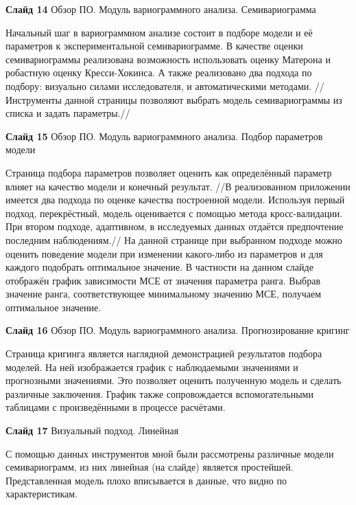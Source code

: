 \documentclass[a4paper,10pt]{report}
\begin{document}
\textbf{Слайд 14} Обзор ПО. Модуль вариограммного анализа. Семивариограмма

Начальный шаг в вариограммном анализе состоит в подборе модели и её параметров к экспериментальной семивариограмме. В качестве оценки семивариограммы реализована возможность использовать оценку Матерона и робастную оценку Кресси-Хокинса. А также реализовано два подхода по подбору: визуально силами исследователя, и автоматическими методами. //Инструменты данной страницы позволяют выбрать модель семивариограммы из списка и задать параметры.//

\textbf{Слайд 15} Обзор ПО. Модуль вариограммного анализа. Подбор параметров модели

Страница подбора параметров позволяет оценить как определённый параметр влияет на качество модели и конечный результат. //В реализованном приложении имеется два подхода по оценке качества построенной модели. Используя первый подход, перекрёстный, модель оценивается с помощью метода кросс-валидации. При втором подходе, адаптивном, в исследуемых данных отдаётся предпочтение последним наблюдениям.// На данной странице при выбранном подходе можно оценить поведение модели при изменении какого-либо из параметров и для каждого подобрать оптимальное значение. В частности на данном слайде отображён график зависимости МСЕ от значения параметра ранга. Выбрав значение ранга, соответствующее минимальному значению МСЕ, получаем оптимальное значение.

\textbf{Слайд 16} Обзор ПО. Модуль вариограммного анализа. Прогнозирование кригинг

Страница кригинга является наглядной демонстрацией результатов подбора моделей. На ней изображается график с наблюдаемыми значениями и прогнозными значениями. Это позволяет оценить полученную модель и сделать различные заключения. График также сопровождается вспомогательными таблицами с произведёнными в процессе расчётами.

\textbf{Слайд 17} Визуальный подход. Линейная

С помощью данных инструментов мной были рассмотрены различные модели семивариограмм, из них линейная (на слайде) является простейшей. Представленная модель плохо вписывается в данные, что видно по характеристикам.


\end{document}
